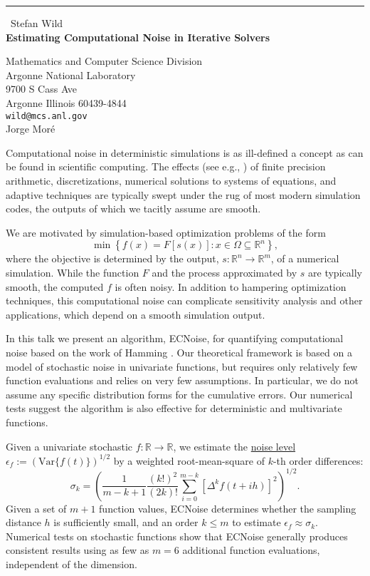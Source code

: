 \documentclass{report}
\begin{document}
\begin{center}
\rule{6in}{1pt} \
{\large Stefan Wild \\
{\bf Estimating Computational Noise in Iterative Solvers}}

Mathematics and Computer Science Division \\ Argonne National Laboratory \\ 9700 S Cass Ave \\ Argonne Illinois 60439-4844
\\
{\tt wild@mcs.anl.gov}\\
Jorge Mor\'{e}\end{center}


Computational noise in deterministic simulations is as ill-defined a
concept as can be found in scientific computing. The effects (see e.g.,
\cite{Higham2002}) of finite precision arithmetic, discretizations,
numerical solutions to systems of equations, and adaptive techniques are
typically swept under the rug of most modern simulation codes, the
outputs of which we tacitly assume are smooth.

We are motivated by simulation-based optimization problems of the form
\begin{equation}
\min\left\{ f(x)=F[s(x)] : x\in \Omega\subseteq \mathbb{R}^n\right\},
\label{eq:spopt}
\end{equation}
where the objective is determined by the output,
$s:\mathbb{R}^n\rightarrow \mathbb{R}^m$, of a numerical simulation.
While the function $F$ and the process approximated by $s$ are typically
smooth, the computed $f$ is often noisy. In addition to hampering
optimization techniques, this computational noise can complicate
sensitivity analysis and other applications, which depend on a smooth
simulation output.

In this talk we present an algorithm, \textsf{ECNoise}, for quantifying
computational noise based on the work of Hamming \cite{hamming1971ian}.
Our theoretical framework is based on a model of stochastic noise in
univariate functions,
but requires only relatively few function evaluations and relies on very
few assumptions. In particular, we do not assume any specific
distribution forms for the cumulative errors. Our numerical tests suggest
the algorithm is also effective for deterministic and multivariate
functions.

Given a univariate stochastic $f: \mathbb{R} \rightarrow \mathbb{R}$, we
estimate the \underline{noise level}
$\epsilon_f:=\left(\mbox{Var}\{f(t)\}\right)^{1/2}$ by a weighted
root-mean-square of $k$-th order differences:
\begin{equation}
\sigma_k = \left(\frac{1}{m-k+1}\frac{(k!)^2}{(2k)!} \sum_{i=0}^{m-k}
\left[\Delta^k f(t+ih) \right]^2\right)^{1/2}.
\label{eq:est}
\end{equation}
Given a set of $m+1$ function values, \textsf{ECNoise} determines whether
the sampling distance $h$ is sufficiently small, and an order $k\leq m$
to estimate $\epsilon_f \approx \sigma_k$. Numerical tests on stochastic
functions show that \textsf{ECNoise} generally produces consistent
results using as few as $m=6$ additional function evaluations,
independent of the dimension.
\end{document}
